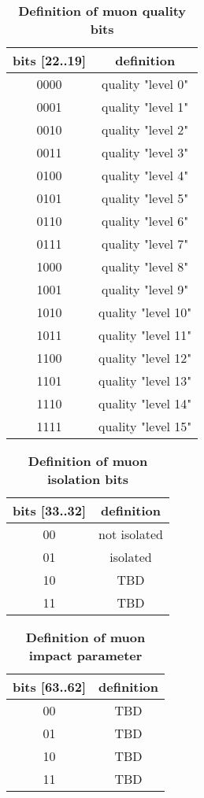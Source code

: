 \documentclass{cmspaper}
\begin{document}
\begin{table}[ht]
\caption{\bf Definition of muon quality bits}
\vspace{5mm}
\centering
\begin{tabular}{|c|c|}\hline
bits [22..19] & definition \\\hline\hline
0000 & quality "level 0" \\
0001 & quality "level 1" \\
0010 & quality "level 2" \\
0011 & quality "level 3" \\
0100 & quality "level 4" \\
0101 & quality "level 5" \\
0110 & quality "level 6" \\
0111 & quality "level 7" \\
1000 & quality "level 8" \\
1001 & quality "level 9" \\
1010 & quality "level 10" \\
1011 & quality "level 11" \\
1100 & quality "level 12" \\
1101 & quality "level 13" \\
1110 & quality "level 14" \\
1111 & quality "level 15" \\\hline
\end{tabular}
\label{table:muon_quality_bits}
\end{table}

\begin{table}[ht]
\caption{\bf Definition of muon isolation bits}
\vspace{5mm}
\centering
\begin{tabular}{|c|c|}\hline
bits [33..32] & definition \\\hline\hline
00 & not isolated \\
01 & isolated \\
10 & TBD \\
11 & TBD \\\hline
\end{tabular}
\label{table:muon_iso_bits}
\end{table}

\begin{table}[ht]
\caption{\bf Definition of muon impact parameter}
\vspace{5mm}
\centering
\begin{tabular}{|c|c|}\hline
bits [63..62] & definition \\\hline\hline
00 & TBD \\
01 & TBD \\
10 & TBD \\
11 & TBD \\\hline
\end{tabular}
\label{table:muon_iso_bits}
\end{table}
\end{document}
